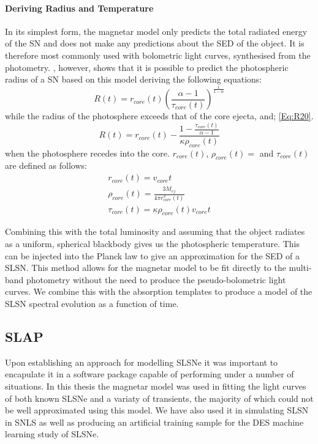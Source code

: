 \paragraph{Deriving Radius and Temperature}
In its simplest form, the magnetar model only predicts the total radiated energy of the SN and does not make any predictions about the SED of the object. It is therefore most commonly used with bolometric light curves, synthesised from the photometry. \citet{2013ApJ...770..128I}, however, shows that it is possible to predict the photospheric radius of a SN based on this model deriving the following equations:
\begin{equation}
\label{Eq:R19}
R(t) = r_{core}(t) \left(\frac{\alpha - 1}{\tau_{core}(t)}\right)^\frac{1}{1 - \alpha}
\end{equation}
\noindent while the radius of the photosphere exceeds that of the core ejecta, and;
\ref{Eq:R20}.
\begin{equation}
\label{Eq:R20}
R(t) = r_{core}(t) - \frac{1 - \frac{\tau_{core}(t)}{\alpha - 1}}{\kappa \rho_{core}(t)}
\end{equation}
\noindent when the photosphere recedes into the core. $r_{core}(t)$, $\rho_{core}(t)=$ and $\tau_{core}(t)$ are defined as follows:
\begin{align}
r_{core}(t) = v_{core}  t \\
\rho_{core}(t)= \frac{3 M_{ej}}{4  \pi  r_{core}^3(t)}\\
\tau_{core}(t) = \kappa  \rho_{core}(t) v_{core} t
\end{align}

Combining this with the total luminosity and assuming that the object radiates as a uniform, spherical blackbody gives us the photospheric temperature. This can be injected into the Planck law to give an approximation for the SED of a SLSN. This method allows for the magnetar model to be fit directly to the multi-band photometry without the need to produce the pseudo-bolometric light curves. We combine this with the absorption templates to produce a model of the SLSN spectral evolution as a function of time.

\subsection{SLAP}
Upon establishing an approach for modelling SLSNe it was important to encapulate it in a software package capable of performing under a number of situations. In this thesis the magnetar model was used in fitting the light curves of both known SLSNe and a variaty of transients, the majority of which could not be well approximated using this model. We have also used it in simulating SLSN in SNLS as well as producing an artificial training sample for the DES machine learning study of SLSNe.

